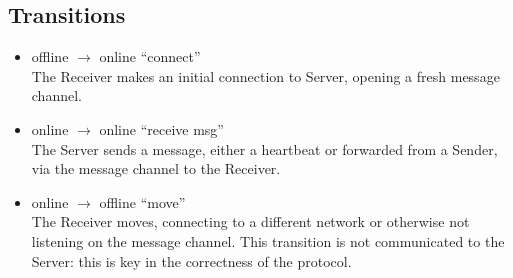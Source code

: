 \documentclass[11pt]{article}
\begin{document}
\subsection*{Transitions}
\begin{itemize}
\item offline $\rightarrow$ online ``connect'' \\
The Receiver makes an initial connection to Server, opening a fresh message
channel.
\item online $\rightarrow$ online ``receive msg'' \\
The Server sends a message, either a heartbeat or forwarded from a Sender, via
the message channel to the Receiver.
\item online $\rightarrow$ offline ``move'' \\
The Receiver moves, connecting to a different network or otherwise not
listening on the message channel. This transition is not communicated to the
Server: this is key in the correctness of the protocol.
\end{itemize}
\end{document}
